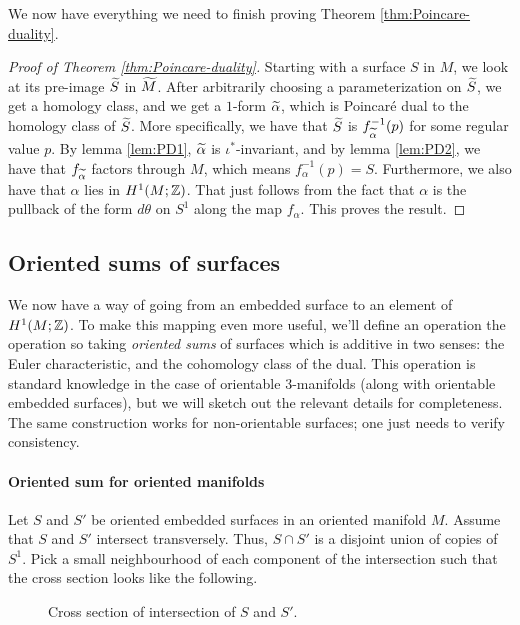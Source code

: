 We now have everything we need to finish proving Theorem \ref{thm:Poincare-duality}.
\begin{proof}[Proof of Theorem \ref{thm:Poincare-duality}]
  Starting with a surface $S$ in $M$, we look at its pre-image $\widetilde{S}$ in $\widetilde{M}$. After
  arbitrarily choosing a parameterization on $\widetilde{S}$, we get a homology class, and we get a
  $1$-form $\widetilde{\alpha}$, which is Poincar\'e dual to the homology class of $\widetilde{S}$.  More
  specifically, we have that $\widetilde{S}$ is $f^{-1}_{\widetilde{\alpha}}(p)$ for some regular value $p$.
  By lemma \ref{lem:PD1}, $\widetilde{\alpha}$ is $\iota^{\ast}$-invariant, and by lemma \ref{lem:PD2},
  we have that $f_{\widetilde{\alpha}}$ factors through $M$, which means $f_{\alpha}^{-1}(p) = S$. Furthermore,
  we also have that $\alpha$ lies in $H^1(M; \mathbb{Z})$. That just follows from the fact that $\alpha$
  is the pullback of the form $d\theta$ on $S^1$ along the map $f_{\alpha}$. This proves the result.
\end{proof}

\subsection{Oriented sums of surfaces}
\label{sec:orient-sums-surf}

We now have a way of going from an embedded surface to an element of $H^1(M; \mathbb{Z})$. To make this mapping even
more useful, we'll define an operation the operation so taking \emph{oriented sums} of surfaces which is
additive in two senses: the Euler characteristic, and the cohomology class of the dual. This operation
is standard knowledge in the case of orientable $3$-manifolds (along with orientable embedded surfaces), but
we will sketch out the relevant details for completeness. The same construction works for non-orientable surfaces;
one just needs to verify consistency.

\paragraph{Oriented sum for oriented manifolds}
Let $S$ and $S'$ be oriented embedded surfaces in an oriented manifold $M$. Assume that $S$ and $S'$ intersect
transversely. Thus, $S \cap S'$ is a disjoint union of copies of $S^1$. Pick a small neighbourhood of each
component of the intersection such that the cross section looks like the following.
\begin{figure}[h]
  \centering
  \caption{Cross section of intersection of $S$ and $S'$.}
  \label{fig:cross-section}
\end{figure}


